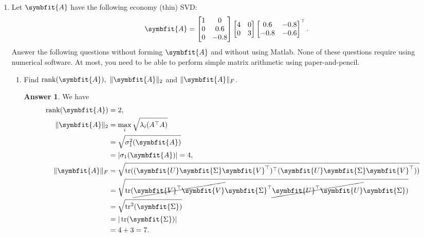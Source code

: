 \documentclass{article}
\theoremstyle{definition}
\newtheorem*{answer}{Answer}
\newcommand{\mat}[1]{\symbfit{#1}}
\begin{document}
\begin{enumerate}[leftmargin=\labelsep]
	\item Let \(\mat{A}\) have the following economy (thin) SVD:
	      \[
		      \mat{A} = \begin{bmatrix}
			      1 & 0    \\
			      0 & 0.6  \\
			      0 & -0.8
		      \end{bmatrix}
		      \begin{bmatrix}
			      4 & 0 \\
			      0 & 3
		      \end{bmatrix}
		      \begin{bmatrix}
			      0.6  & -0.8 \\
			      -0.8 & -0.6 \\
		      \end{bmatrix}^\top.
	      \]
	      Answer the following questions without forming \(\mat{A}\) and without using Matlab. None of these questions require using numerical software. At most, you need to be able to perform simple matrix arithmetic using paper-and-pencil.
	      \begin{enumerate}
		      \item Find \(\rank(\mat{A}),\ \|\mat{A}\|_2\) and \(\|\mat{A}\|_F\).
		            \begin{answer}
			            We have
			            \begin{align*}
				            \rank(\mat{A}) & = 2,                                                                                                   \\
				            \|\mat{A}\|_2  & = \max_i \sqrt{\lambda_i(A^\top A)}                                                                    \\
				                           & = \sqrt{\sigma_1^2(\mat{A})}                                                                           \\
				                           & = |\sigma_1(\mat{A})| = 4,                                                                             \\
				            \|\mat{A}\|_F  & = \sqrt{\trace((\mat{U}\mat{\Sigma}\mat{V}^\top)^\top(\mat{U}\mat{\Sigma}\mat{V}^\top))}               \\
				                           & = \sqrt{\trace(\cancel{\mat{V}^\top\mat{V}}\mat{\Sigma}^\top\cancel{\mat{U}^\top\mat{U}}\mat{\Sigma})} \\
				                           & = \sqrt{\trace^2(\mat{\Sigma})}                                                                        \\
				                           & = |\trace(\mat{\Sigma})|                                                                               \\
				                           & = 4 + 3 = 7.
			            \end{align*}
		            \end{answer}


\end{enumerate}
\end{enumerate}
\end{document}
